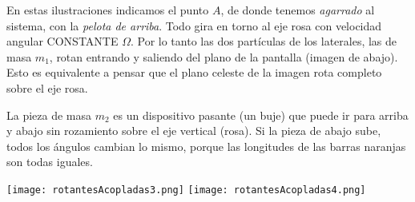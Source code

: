 \documentclass[11pt, spanish, a4paper, twoside]{article}
\begin{document}
\begin{enumerate}
	En estas ilustraciones indicamos el punto \(A\), de donde tenemos \emph{agarrado} al sistema, con la \emph{pelota de arriba}.
	Todo gira en torno al eje rosa con velocidad angular CONSTANTE $\Omega$.
	Por lo tanto las dos partículas de los laterales, las de masa $m_1$, rotan entrando y saliendo del plano de la pantalla (imagen de abajo).
	Esto es equivalente a pensar que el plano celeste de la imagen rota completo sobre el eje rosa.
	
	La pieza de masa $m_2$ es un dispositivo pasante (un buje) que puede ir para arriba y abajo sin rozamiento sobre el eje vertical (rosa).
	Si la pieza de abajo sube, todos los ángulos cambian lo mismo, porque las longitudes de las barras naranjas son todas iguales.
	
	\begin{center}
		\texttt{[image: rotantesAcopladas3.png]}
		\texttt{[image: rotantesAcopladas4.png]}
	\end{center}
	

\end{enumerate}
\end{document}
